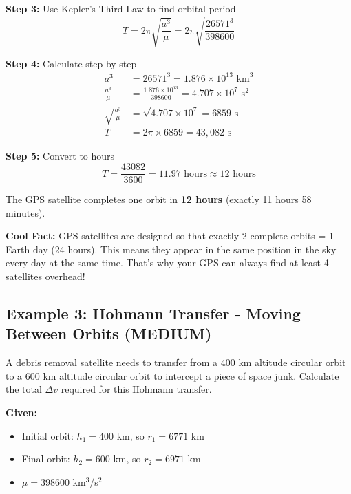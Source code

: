 \documentclass[11pt,a4paper]{article}
\begin{document}
\textbf{Step 3:} Use Kepler's Third Law to find orbital period
\begin{equation}
T = 2\pi\sqrt{\frac{a^3}{\mu}} = 2\pi\sqrt{\frac{26571^3}{398600}}
\end{equation}

\textbf{Step 4:} Calculate step by step
\begin{align}
a^3 &= 26571^3 = 1.876 \times 10^{13} \text{ km}^3 \\
\frac{a^3}{\mu} &= \frac{1.876 \times 10^{13}}{398600} = 4.707 \times 10^7 \text{ s}^2 \\
\sqrt{\frac{a^3}{\mu}} &= \sqrt{4.707 \times 10^7} = 6859 \text{ s} \\
T &= 2\pi \times 6859 = 43,082 \text{ s}
\end{align}

\textbf{Step 5:} Convert to hours
\begin{equation}
T = \frac{43082}{3600} = 11.97 \text{ hours} \approx 12 \text{ hours}
\end{equation}

\begin{tcolorbox}[colback=blue!5!white,colframe=blue!60!black,title=Answer]
The GPS satellite completes one orbit in \textbf{12 hours} (exactly 11 hours 58 minutes).

\textbf{Cool Fact:} GPS satellites are designed so that exactly 2 complete orbits = 1 Earth day (24 hours). This means they appear in the same position in the sky every day at the same time. That's why your GPS can always find at least 4 satellites overhead!
\end{tcolorbox}

\subsection{Example 3: Hohmann Transfer - Moving Between Orbits (MEDIUM)}

\begin{tcolorbox}[colback=green!5!white,colframe=green!60!black,title=Problem]
A debris removal satellite needs to transfer from a 400 km altitude circular orbit to a 600 km altitude circular orbit to intercept a piece of space junk. Calculate the total $\Delta v$ required for this Hohmann transfer.

\textbf{Given:}
\begin{itemize}[nosep]
    \item Initial orbit: $h_1 = 400$ km, so $r_1 = 6771$ km
    \item Final orbit: $h_2 = 600$ km, so $r_2 = 6971$ km
    \item $\mu = 398600$ km$^3$/s$^2$
\end{itemize}
\end{tcolorbox}
\end{document}
